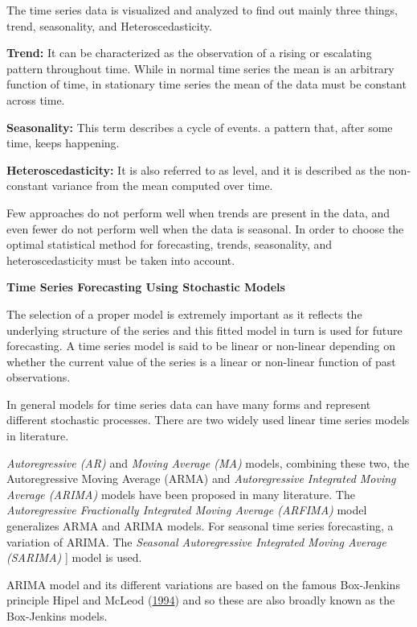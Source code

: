 \documentclass[12pt,a4paper]{book}
\begin{document}
{The time series data is visualized and analyzed to find out mainly three
things, trend, seasonality, and Heteroscedasticity.

\textbf{Trend:} It can be characterized as the observation of a rising
or escalating pattern throughout time. While in normal time series the
mean is an arbitrary function of time, in stationary time series the
mean of the data must be constant across time.

\textbf{Seasonality:} This term describes a cycle of events. a pattern
that, after some time, keeps happening.

\textbf{Heteroscedasticity:} It is also referred to as level, and it is
described as the non-constant variance from the mean computed over time.

Few approaches do not perform well when trends are present in the data,
and even fewer do not perform well when the data is seasonal. In order
to choose the optimal statistical method for forecasting, trends,
seasonality, and heteroscedasticity must be taken into account.

\textbf{Time Series Forecasting Using Stochastic Models}

The selection of a proper model is extremely important as it reflects
the underlying structure of the series and this fitted model in turn is
used for future forecasting. A time series model is said to be linear or
non-linear depending on whether the current value of the series is a
linear or non-linear function of past observations.

In general models for time series data can have many forms and represent
different stochastic processes. There are two widely used linear time
series models in literature.

\emph{Autoregressive (AR)} and \emph{Moving Average (MA)} models,
combining these two, the Autoregressive Moving Average (ARMA) and
\emph{Autoregressive Integrated Moving Average (ARIMA)} models have been
proposed in many literature. The \emph{Autoregressive Fractionally
Integrated Moving Average (ARFIMA)} model generalizes ARMA and ARIMA
models. For seasonal time series forecasting, a variation of ARIMA. The
\emph{Seasonal Autoregressive Integrated Moving Average (SARIMA)} {]}
model is used.

ARIMA model and its different variations are based on the famous
Box-Jenkins principle Hipel and McLeod
(\protect\hyperlink{ref-hipel1994}{1994}) and so these are also broadly
known as the Box-Jenkins models.

}
\end{document}
